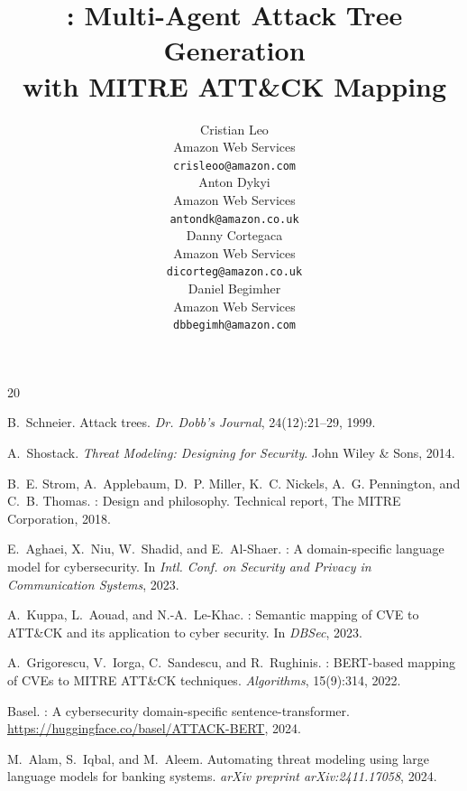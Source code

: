 \documentclass{article}
\title{\threatforest{}: Multi-Agent Attack Tree Generation\\with MITRE ATT\&CK Mapping}
\author{
  Cristian Leo \\
  Amazon Web Services \\
  \texttt{crisleoo@amazon.com} \\
  \And
  Anton Dykyi \\
  Amazon Web Services \\
  \texttt{antondk@amazon.co.uk} \\
  \And
  Danny Cortegaca \\
  Amazon Web Services \\
  \texttt{dicorteg@amazon.co.uk} \\
  \And
  Daniel Begimher \\
  Amazon Web Services \\
  \texttt{dbbegimh@amazon.com} \\
}
\begin{document}
\maketitle












\begin{thebibliography}{20}

B.~Schneier.
\newblock Attack trees.
\newblock \emph{Dr. Dobb's Journal}, 24(12):21--29, 1999.

A.~Shostack.
\newblock \emph{Threat Modeling: Designing for Security}.
\newblock John Wiley \& Sons, 2014.

B.~E. Strom, A.~Applebaum, D.~P. Miller, K.~C. Nickels, A.~G. Pennington, and C.~B. Thomas.
: Design and philosophy.
\newblock Technical report, The MITRE Corporation, 2018.

E.~Aghaei, X.~Niu, W.~Shadid, and E.~Al-Shaer.
: A domain-specific language model for cybersecurity.
\newblock In \emph{Intl. Conf. on Security and Privacy in Communication Systems}, 2023.

A.~Kuppa, L.~Aouad, and N.-A.~Le-Khac.
: Semantic mapping of {CVE} to {ATT\&CK} and its application to cyber security.
\newblock In \emph{DBSec}, 2023.

A.~Grigorescu, V.~Iorga, C.~Sandescu, and R.~Rughinis.
: {BERT}-based mapping of {CVEs} to {MITRE ATT\&CK} techniques.
\newblock \emph{Algorithms}, 15(9):314, 2022.

Basel.
: A cybersecurity domain-specific sentence-transformer.
\newblock \url{https://huggingface.co/basel/ATTACK-BERT}, 2024.

M.~Alam, S.~Iqbal, and M.~Aleem.
\newblock Automating threat modeling using large language models for banking systems.
\newblock \emph{arXiv preprint arXiv:2411.17058}, 2024.


\end{thebibliography}
\end{document}
